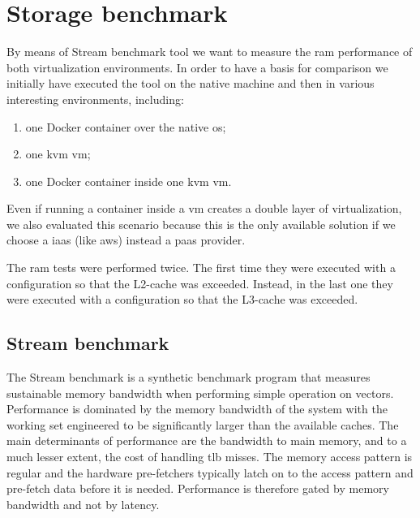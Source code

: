%
%
\section{Storage benchmark}
\label{sec:measurements-storage}
By means of Stream benchmark tool we want to measure the \acs{ram} performance of both virtualization
environments. In order to have a basis for comparison we initially have executed the tool on the native
machine and then in various interesting environments, including:

\begin{enumerate}
	\item{one Docker container over the native \acs{os};}
	\item{one \ac{kvm} \ac{vm};}
	\item{one Docker container inside one \ac{kvm} \ac{vm}.}
\end{enumerate}

Even if running a container inside a \ac{vm} creates a double layer of virtualization, we also evaluated
this scenario because this is the only available solution if we choose a \ac{iaas} (like \ac{aws}) instead
a \ac{paas} provider.

The \acs{ram} tests were performed twice. The first time they were executed with a configuration so that
the L2-cache was exceeded. Instead, in the last one they were executed with a configuration so that the
L3-cache was exceeded.

\subsection{Stream benchmark}
\label{sec:measurements-storage-stream}
The Stream benchmark \cite{streamBenchmark} is a synthetic benchmark program that measures sustainable
memory bandwidth when performing simple operation on vectors. Performance is dominated by the memory
bandwidth of the system with the working set engineered to be significantly larger than the available
caches. The main determinants of performance are the bandwidth to main memory, and to a much lesser
extent, the cost of handling \ac{tlb} misses. The memory access pattern is regular and the hardware
pre-fetchers typically latch on to the access pattern and pre-fetch data before it is needed. Performance
is therefore gated by memory bandwidth and not by latency.

